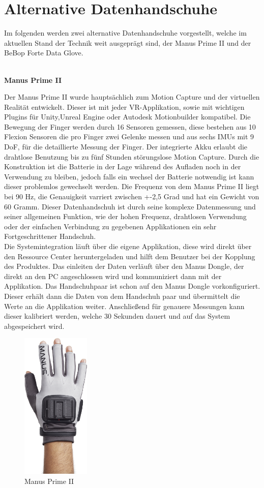 \section{Alternative Datenhandschuhe}\label{alternativeDatenhandschuhe}
Im folgenden werden zwei alternative Datenhandschuhe vorgestellt, welche im aktuellen Stand der Technik weit ausgeprägt sind, der Manus Prime II und der BeBop Forte Data Glove. 
\\
\\
\begin{center}
\textbf{Manus Prime II}
\end{center}
Der Manus Prime II \parencite{web:ManusPrimeII} wurde hauptsächlich zum Motion Capture und der virtuellen Realität entwickelt. Dieser ist mit jeder VR-Applikation, sowie mit wichtigen Plugins für Unity,Unreal Engine oder Autodesk Motionbuilder kompatibel. Die Bewegung der Finger werden durch 16 Sensoren gemessen, diese bestehen aus 10 Flexion Sensoren die pro Finger zwei Gelenke messen und aus sechs IMUs mit 9 DoF, für die detaillierte Messung der Finger. Der integrierte Akku erlaubt die drahtlose Benutzung bis zu fünf Stunden störungslose Motion Capture. Durch die Konstruktion ist die Batterie in der Lage während des Aufladen noch in der Verwendung zu bleiben, jedoch falls ein wechsel der Batterie notwendig ist kann dieser problemlos gewechselt werden. Die Frequenz von dem Manus Prime II liegt bei 90 Hz, die Genauigkeit varriert zwischen +-2,5 Grad und hat ein Gewicht von 60 Gramm. Dieser Datenhandschuh ist durch seine komplexe Datenmessung und seiner allgemeinen Funktion, wie der hohen Frequenz, drahtlosen Verwendung oder der einfachen Verbindung zu gegebenen Applikationen ein sehr Fortgeschrittener Handschuh.
\\
Die Systemintegration läuft über die eigene Applikation, diese wird direkt über den Ressource Center heruntergeladen und hilft dem Benutzer bei der Kopplung des Produktes.
Das einleiten der Daten verläuft über den Manus Dongle, der direkt an den PC angeschlossen wird und kommuniziert dann mit der Applikation. Das Handschuhpaar ist schon auf den Manus Dongle vorkonfiguriert. Dieser erhält dann die Daten von dem Handschuh paar und übermittelt die Werte an die Applikation weiter. Anschließend für genauere Messungen kann dieser kalibriert werden, welche 30 Sekunden dauert und auf das System abgespeichert wird.
\begin{figure}[h]
	\centering
    \includegraphics[height=200pt]{Bachelorarbeit/images/ManusPrimeII.png}
    \caption{Manus Prime II}
    \label{fig:ManusPrimeII}
\end{figure}
